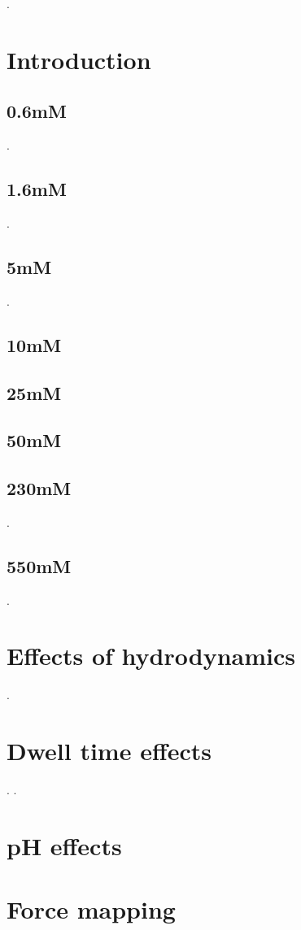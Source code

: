 \cite{John}.


\section{Introduction}

\newpage

\subsection{0.6mM}

\newpage.
\newpage

\subsection{1.6mM}

\newpage.
\newpage

\subsection{5mM}

\newpage.
\newpage

\subsection{10mM}

\newpage

\subsection{25mM}

\newpage

\subsection{50mM}

\newpage

\subsection{230mM}

\newpage.
\newpage

\subsection{550mM}

\newpage.
\newpage

\section{Effects of hydrodynamics}

\newpage.
\newpage

\section{Dwell time effects}

\newpage.
\newpage.
\newpage

\section{pH effects}

\newpage
\newpage

\section{Force mapping}